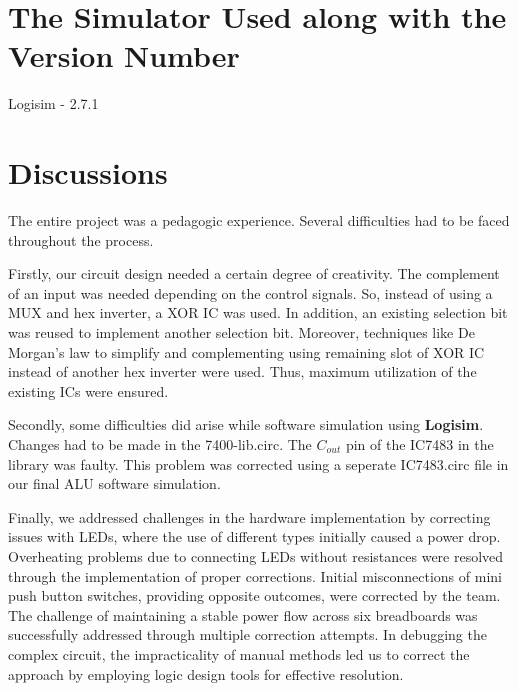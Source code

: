 \documentclass[18pt]{article}
\begin{document}
\section{The Simulator Used along with the Version Number}

\large

Logisim - 2.7.1

\normalsize

\section{Discussions}
\large
\justifying
The entire project was a pedagogic experience. Several difficulties had to be faced throughout the process.\par 
\vspace{5mm}
Firstly, our circuit design needed a certain degree of creativity. The complement of an input was needed depending on the control signals. So, instead of using a MUX and hex inverter, a XOR IC was used. In addition, an existing selection bit was reused to implement another selection bit. Moreover, techniques like De Morgan's law to simplify and complementing using remaining slot of XOR IC instead of another hex inverter were used. Thus, maximum utilization of the existing ICs were ensured.\par
\vspace{5mm}
Secondly, some difficulties did arise while software simulation using \textbf{Logisim}. 
Changes had to be made in the 7400-lib.circ. 
The $C_{out}$ pin of the IC7483 in the library was faulty. This problem was corrected using a seperate IC7483.circ file in our final ALU software simulation.\par
\vspace{5mm}
Finally, we addressed challenges in the hardware implementation by correcting issues with LEDs, where the use of different types initially caused a power drop. Overheating problems due to connecting LEDs without resistances were resolved through the implementation of proper corrections. Initial misconnections of mini push button switches, providing opposite outcomes, were corrected by the team. The challenge of maintaining a stable power flow across six breadboards was successfully addressed through multiple correction attempts. In debugging the complex circuit, the impracticality of manual methods led us to correct the approach by employing logic design tools for effective resolution.
\newpage
\end{document}
